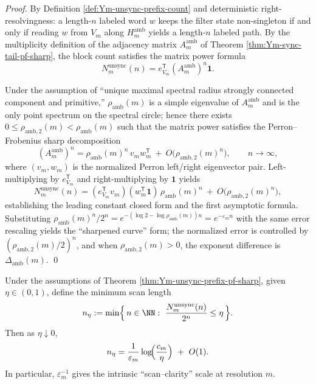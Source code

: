 \begin{proof}
By Definition \ref{def:Ym-unsync-prefix-count} and deterministic right-resolvingness: a length-\(n\) labeled word \(w\) keeps the filter state non-singleton if and only if reading \(w\) from \(V_m\) along \(H_m^{\mathrm{amb}}\) yields a length-\(n\) labeled path.
By the multiplicity definition of the adjacency matrix \(A_m^{\mathrm{amb}}\) of Theorem \ref{thm:Ym-sync-tail-pf-sharp}, the block count satisfies the matrix power formula
\[
N_m^{\mathrm{unsync}}(n)=e_{V_m}^{\mathsf T}(A_m^{\mathrm{amb}})^n\mathbf 1.
\]
\par
Under the assumption of ``unique maximal spectral radius strongly connected component and primitive,'' \(\rho_{\mathrm{amb}}(m)\) is a simple eigenvalue of \(A_m^{\mathrm{amb}}\) and is the only point spectrum on the spectral circle;
hence there exists \(0\le \rho_{\mathrm{amb},2}(m)<\rho_{\mathrm{amb}}(m)\) such that the matrix power satisfies the Perron--Frobenius sharp decomposition
\[
(A_m^{\mathrm{amb}})^n=\rho_{\mathrm{amb}}(m)^n\,v_m w_m^{\mathsf T}\ +\ O\!\bigl(\rho_{\mathrm{amb},2}(m)^n\bigr),
\qquad n\to\infty,
\]
where \((v_m,w_m)\) is the normalized Perron left/right eigenvector pair.
Left-multiplying by \(e_{V_m}^{\mathsf T}\) and right-multiplying by \(\mathbf 1\) yields
\[
N_m^{\mathrm{unsync}}(n)
=(e_{V_m}^{\mathsf T}v_m)(w_m^{\mathsf T}\mathbf 1)\,\rho_{\mathrm{amb}}(m)^n\ +\ O\!\bigl(\rho_{\mathrm{amb},2}(m)^n\bigr),
\]
establishing the leading constant closed form and the first asymptotic formula.
Substituting \(\rho_{\mathrm{amb}}(m)^n/2^n=e^{-(\log 2-\log\rho_{\mathrm{amb}}(m))n}=e^{-\varepsilon_m n}\) with the same error rescaling yields the ``sharpened curve'' form; the normalized error is controlled by \((\rho_{\mathrm{amb},2}(m)/2)^n\), and when \(\rho_{\mathrm{amb},2}(m)>0\), the exponent difference is \(\Delta_{\mathrm{amb}}(m)\).
\qed
\end{proof}

\begin{corollary}\label{cor:Ym-scan-length-asymptotic}
Under the assumptions of Theorem \ref{thm:Ym-unsync-prefix-pf-sharp}, given \(\eta\in(0,1)\), define the minimum scan length
\[
n_{\eta}:=\min\Bigl\{\,n\in\NN:\ \frac{N_m^{\mathrm{unsync}}(n)}{2^n}\le \eta\,\Bigr\}.
\]
Then as \(\eta\downarrow 0\),
\[
n_{\eta}
=\frac{1}{\varepsilon_m}\log\!\Bigl(\frac{c_m}{\eta}\Bigr)\ +\ O(1).
\]
In particular, \(\varepsilon_m^{-1}\) gives the intrinsic ``scan--clarity'' scale at resolution \(m\).
\end{corollary}

